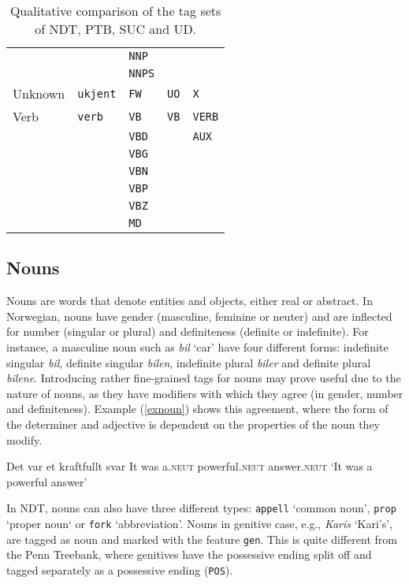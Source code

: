 \documentclass[a4paper,12pt,english]{book}
\begin{document}
\begin{table}
\begin{tabular}{lllll}
        & & \texttt{NNP} & & \\
        & & \texttt{NNPS} & & \\
        \midrule
        Unknown & \texttt{ukjent} & \texttt{FW} & \texttt{UO} & \texttt{X} \\
        \midrule
        Verb & \texttt{verb} & \texttt{VB} & \texttt{VB} & \texttt{VERB} \\
        & & \texttt{VBD} & & \texttt{AUX} \\
        & & \texttt{VBG} & & \\
        & & \texttt{VBN} & & \\
        & & \texttt{VBP} & & \\
        & & \texttt{VBZ} & & \\
        & & \texttt{MD} & & \\
        \bottomrule
    \end{tabular}
    \caption{Qualitative comparison of the tag sets of NDT, PTB, SUC and UD.}
    \label{comptagsets}
\end{table}

\subsection{Nouns}
\label{subsec:noun}
Nouns are words that denote entities and objects, either real or abstract. In
Norwegian, nouns have gender (masculine, feminine or neuter) and are inflected
for number (singular or plural) and definiteness (definite or indefinite). For
instance, a masculine noun such as \emph{bil} `car' have four different forms:
indefinite singular \emph{bil}, definite singular \emph{bilen}, indefinite
plural \emph{biler} and definite plural \emph{bilene}.  Introducing rather
fine-grained tags for nouns may prove useful due to the nature of nouns, as
they have modifiers with which they agree (in gender, number and definiteness).
Example (\ref{exnoun}) shows this agreement, where the form of the determiner
and adjective is dependent on the properties of the noun they modify.

\begin{examples}
\item \gll Det var et kraftfullt svar
    It was a.\textsc{neut} powerful.\textsc{neut} answer.\textsc{neut}
    \glt `It was a powerful answer'
    \glend
    \label{exnoun}
\end{examples}

In NDT, nouns can also have three different types: \texttt{appell} `common
noun', \texttt{prop} `proper noun` or \texttt{fork} `abbreviation'. Nouns in
genitive case, e.g., \emph{Karis} `Kari's', are tagged as noun and marked with
the feature \texttt{gen}. This is quite different from the Penn Treebank, where
genitives have the possessive ending split off and tagged separately as a
possessive ending (\texttt{POS}).
\end{document}
